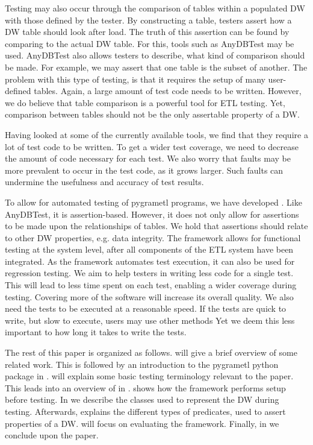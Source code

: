 Testing may also occur through the comparison of tables within a populated DW with those defined by the tester. By constructing a table, testers assert how a DW table should look after load. The truth of this assertion can be found by comparing to the actual DW table. For this, tools such as AnyDBTest\cite{AnyDbTest} may be used. AnyDBTest also allows testers to describe, what kind of comparison should be made. For example, we may assert that one table is the subset of another. The problem with this type of testing, is that it requires the setup of many user-defined tables. Again, a large amount of test code needs to be written. However, we do believe that table comparison is a powerful tool for ETL testing. Yet, comparison between tables should not be the only assertable property of a DW.

Having looked at some of the currently available tools, we find that they require a lot of test code to be written. To get a wider test coverage, we need to decrease the amount of code necessary for each test. We also worry that faults may be more prevalent to occur in the test code, as it grows larger. Such faults can undermine the usefulness and accuracy of test results.

To allow for automated testing of pygrametl programs, we have developed \textit{\FW{}}. Like AnyDBTest, it is assertion-based. However, it does not only allow for assertions to be made upon the relationships of tables. We hold that assertions should relate to other DW properties, e.g. data integrity. The framework allows for functional testing at the system level, after all components of the ETL system have been integrated. As the framework automates test execution, it can also be used for regression testing. We aim to help testers in writing less code for a single test. This will lead to less time spent on each test, enabling a wider coverage during testing. Covering more of the software will increase its overall quality. We also need the tests to be executed at a reasonable speed. If the tests are quick to write, but slow to execute, users may use other methods Yet we deem this less important to how long it takes to write the tests.

The rest of this paper is organized as follows.  will give a brief overview of some related work. This is followed by an introduction to the pygrametl python package in .  will explain some basic testing terminology relevant to the paper. This leads into an overview of \FW{} in .  shows how the framework performs setup before testing. In  we describe the classes used to represent the DW during testing. Afterwards,  explains the different types of predicates, used to assert properties of a DW.  will focus on evaluating the framework. Finally, in  we conclude upon the paper.
